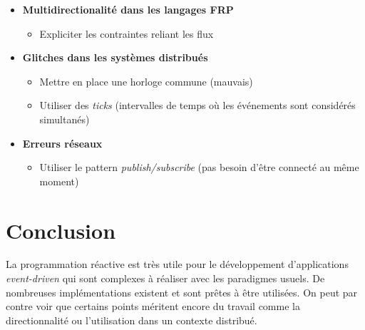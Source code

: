 \documentclass[10pt,final]{IEEEtran}
\begin{document}
\begin{itemize}
    \item \textbf{Multidirectionalité dans les langages FRP}
        \begin{itemize}
            \item Expliciter les contraintes reliant les flux 
        \end{itemize}
    \item \textbf{Glitches dans les systèmes distribués}
        \begin{itemize}
            \item Mettre en place une horloge commune (mauvais)
            \item Utiliser des \textit{ticks} (intervalles de temps où les événements sont considérés simultanés)
        \end{itemize}
    \item \textbf{Erreurs réseaux}
        \begin{itemize}
            \item Utiliser le pattern \textit{publish/subscribe} (pas besoin d'être connecté au même moment)
        \end{itemize}
\end{itemize}

\section{Conclusion}

La programmation réactive est très utile pour le développement d'applications \textit{event-driven} qui sont complexes à réaliser avec les paradigmes usuels. De nombreuses implémentations existent et sont prêtes à être utilisées. On peut par contre voir que certains points méritent encore du travail comme la directionnalité ou l'utilisation dans un contexte distribué.
\end{document}
